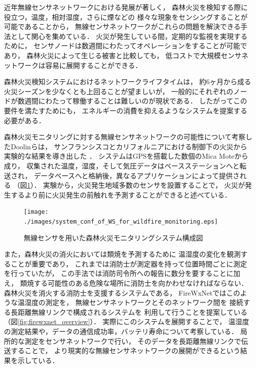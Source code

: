 近年無線センサネットワークにおける発展が著しく，
森林火災を検知する際に役立つ，温度，相対湿度，さらに煙などの
様々な現象をセンシングすることが可能であることから，
無線センサネットワークがこれらの問題を解決できる手法として関心を集めている．
火災が発生している間，定期的な監視を実現するために，
センサノードは数週間にわたってオペレーションをすることが可能であり，
森林火災によって生じる被害と比較しても，
低コストで大規模センサネットワークは容易に展開することができる．


森林火災検知システムにおけるネットワークライフタイムは，
約6ヶ月から成る火災シーズンを少なくとも上回ることが望ましいが，
一般的にそれぞれのノードが数週間にわたって稼働することは難しいのが現状である．
したがってこの要件を満たすためにも，
エネルギーの消費を抑えるようなシステムを提案する必要がある．


森林火災モニタリングに対する無線センサネットワークの可能性について考察したDoolinらは，
サンフランシスコとカリフォルニアにおける制御下の火災から実験的な結果を導き出した
\cite{doi:10.1117/12.605655}．
システムはGPSを搭載した数個のMica Moteから成り，
収集された温度，湿度，そして気圧データはベースステーションへと転送され，
データベースへと格納後，異なるアプリケーションによって提供される
（図\ref{fig:system_conf_of_WS_for_wildfire_monitoring}）．
実験から，火災発生地域多数のセンサを設置することで，
火災が発生するより前に火災発生の前触れを予測することができると述べている．

\begin{figure}[htbp]
 \begin{center}
  \texttt{[image: ./images/system\_conf\_of\_WS\_for\_wildfire\_monitoring.eps]}
 \end{center}
 \caption{無線センサを用いた森林火災モニタリングシステム構成図}
 \label{fig:system_conf_of_WS_for_wildfire_monitoring}
\end{figure}



また，森林火災の消火においては類焼を予測するために
温湿度の変化を観測することが重要であり，
これまでは消防士が測定器を持って位置時間ごとに測定を行っていたが，
この手法では消防司令所への報告に数分を要することに加え，
類焼する可能性のある危険な場所に消防士を向かわせなければならない．
森林火災を消火する消防士を支援するシステムである，
FireWxNet\cite{conf/mobisys/HartungHSH06}ではこのような温湿度の測定を，
無線センサネットワークとそのネットワーク間を
接続する長距離無線リンクで構成されるシステムを
利用して行うことを提案している（図\ref{fig:firewxnet_overview}）．
実際にこのシステムを展開することで，
温湿度の測定結果や，データの通信成功率，バッテリ寿命について考察している．
局所的な測定をセンサネットワークで行い，
そのデータを長距離無線リンクで伝送することで，
より現実的な無線センサネットワークの展開ができるという結果を示している．

